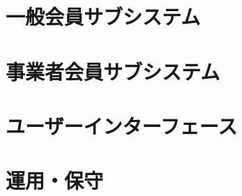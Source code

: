 \documentclass[dvipdfmx]{jlreq}
\begin{document}

\newpage

\tableofcontents
\clearpage





\section{一般会員サブシステム}















\section{事業者会員サブシステム}




















\section{ユーザーインターフェース}




\section{運用・保守}











\end{document}
